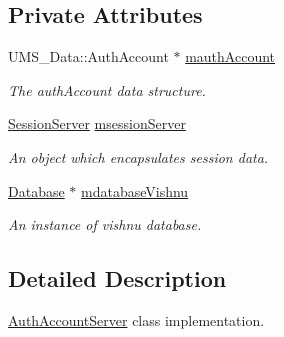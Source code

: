 \subsection*{Private Attributes}
\begin{DoxyCompactItemize}
\item 
\hypertarget{classAuthAccountServer_a4415686e92e3d9327f5134cb1b74579b}{
UMS\_\-Data::AuthAccount $\ast$ \hyperlink{classAuthAccountServer_a4415686e92e3d9327f5134cb1b74579b}{mauthAccount}}
\label{classAuthAccountServer_a4415686e92e3d9327f5134cb1b74579b}

\begin{DoxyCompactList}\small\item\em The authAccount data structure. \item\end{DoxyCompactList}\item 
\hypertarget{classAuthAccountServer_abcf9eb17ff89047f24e38f2eea6c11e2}{
\hyperlink{classSessionServer}{SessionServer} \hyperlink{classAuthAccountServer_abcf9eb17ff89047f24e38f2eea6c11e2}{msessionServer}}
\label{classAuthAccountServer_abcf9eb17ff89047f24e38f2eea6c11e2}

\begin{DoxyCompactList}\small\item\em An object which encapsulates session data. \item\end{DoxyCompactList}\item 
\hypertarget{classAuthAccountServer_a86de212c4a5c6fb77a9680586c51db56}{
\hyperlink{classDatabase}{Database} $\ast$ \hyperlink{classAuthAccountServer_a86de212c4a5c6fb77a9680586c51db56}{mdatabaseVishnu}}
\label{classAuthAccountServer_a86de212c4a5c6fb77a9680586c51db56}

\begin{DoxyCompactList}\small\item\em An instance of vishnu database. \item\end{DoxyCompactList}\end{DoxyCompactItemize}


\subsection{Detailed Description}
\hyperlink{classAuthAccountServer}{AuthAccountServer} class implementation. 

